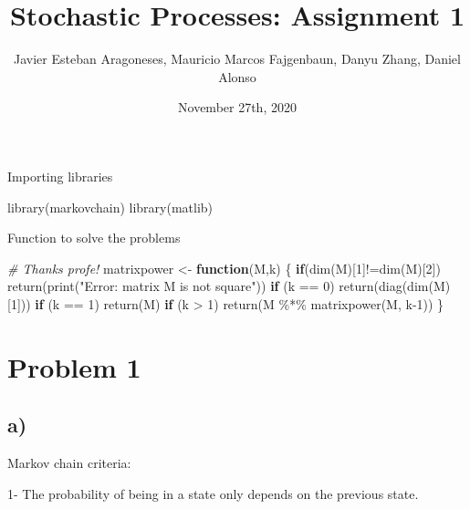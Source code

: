 \documentclass[
]{article}
\title{Stochastic Processes: Assignment 1}
\author{Javier Esteban Aragoneses, Mauricio Marcos Fajgenbaun, Danyu
Zhang, Daniel Alonso}
\date{November 27th, 2020}
\newenvironment{Shaded}{\begin{snugshade}}{\end{snugshade}}
\newcommand{\CommentTok}[1]{\textcolor[rgb]{0.56,0.35,0.01}{\textit{#1}}}
\newcommand{\ControlFlowTok}[1]{\textcolor[rgb]{0.13,0.29,0.53}{\textbf{#1}}}
\newcommand{\DecValTok}[1]{\textcolor[rgb]{0.00,0.00,0.81}{#1}}
\newcommand{\FunctionTok}[1]{\textcolor[rgb]{0.00,0.00,0.00}{#1}}
\newcommand{\NormalTok}[1]{#1}
\newcommand{\OtherTok}[1]{\textcolor[rgb]{0.56,0.35,0.01}{#1}}
\newcommand{\SpecialCharTok}[1]{\textcolor[rgb]{0.00,0.00,0.00}{#1}}
\newcommand{\StringTok}[1]{\textcolor[rgb]{0.31,0.60,0.02}{#1}}
\begin{document}
\maketitle

Importing libraries

\begin{Shaded}
\begin{Highlighting}[]
\FunctionTok{library}\NormalTok{(markovchain)}
\FunctionTok{library}\NormalTok{(matlib)}
\end{Highlighting}
\end{Shaded}

Function to solve the problems

\begin{Shaded}
\begin{Highlighting}[]
\CommentTok{\# Thanks profe!}
\NormalTok{matrixpower }\OtherTok{\textless{}{-}} \ControlFlowTok{function}\NormalTok{(M,k) \{}
  \ControlFlowTok{if}\NormalTok{(}\FunctionTok{dim}\NormalTok{(M)[}\DecValTok{1}\NormalTok{]}\SpecialCharTok{!=}\FunctionTok{dim}\NormalTok{(M)[}\DecValTok{2}\NormalTok{]) }\FunctionTok{return}\NormalTok{(}\FunctionTok{print}\NormalTok{(}\StringTok{"Error: matrix M is not square"}\NormalTok{))}
  \ControlFlowTok{if}\NormalTok{ (k }\SpecialCharTok{==} \DecValTok{0}\NormalTok{) }\FunctionTok{return}\NormalTok{(}\FunctionTok{diag}\NormalTok{(}\FunctionTok{dim}\NormalTok{(M)[}\DecValTok{1}\NormalTok{])) }
  \ControlFlowTok{if}\NormalTok{ (k }\SpecialCharTok{==} \DecValTok{1}\NormalTok{) }\FunctionTok{return}\NormalTok{(M)}
  \ControlFlowTok{if}\NormalTok{ (k }\SpecialCharTok{\textgreater{}} \DecValTok{1}\NormalTok{)  }\FunctionTok{return}\NormalTok{(M }\SpecialCharTok{\%*\%} \FunctionTok{matrixpower}\NormalTok{(M, k}\DecValTok{{-}1}\NormalTok{))}
\NormalTok{\}}
\end{Highlighting}
\end{Shaded}

\hypertarget{problem-1}{%
\section{Problem 1}\label{problem-1}}

\hypertarget{a}{%
\subsection{a)}\label{a}}

Markov chain criteria:

1- The probability of being in a state only depends on the previous
state.
\end{document}
